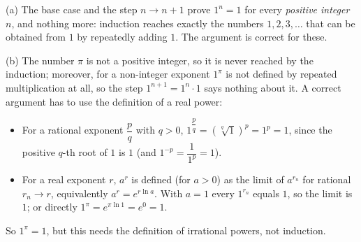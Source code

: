 (a) The base case and the step $n\to n+1$ prove $1^n=1$ for every \emph{positive integer} $n$, and nothing more: induction reaches exactly the numbers $1,2,3,\dots$ that can be obtained from $1$ by repeatedly adding $1$. The argument is correct for these.

(b) The number $\pi$ is not a positive integer, so it is never reached by the induction; moreover, for a non-integer exponent $1^{\pi}$ is not defined by repeated multiplication at all, so the step $1^{n+1}=1^n\cdot1$ says nothing about it. A correct argument has to use the definition of a real power:
\begin{itemize}
\item For a rational exponent $\dfrac{p}{q}$ with $q>0$, $1^{\dfrac{p}{q}}=\left(\sqrt[q]{1}\right)^p=1^p=1$, since the positive $q$-th root of $1$ is $1$ (and $1^{-p}=\dfrac{1}{1^p}=1$).
\item For a real exponent $r$, $a^r$ is defined (for $a>0$) as the limit of $a^{r_n}$ for rational $r_n\to r$, equivalently $a^r=e^{r\ln a}$. With $a=1$ every $1^{r_n}$ equals $1$, so the limit is $1$; or directly $1^{\pi}=e^{\pi\ln1}=e^{0}=1$.
\end{itemize}
So $1^{\pi}=\boxed{1}$, but this needs the definition of irrational powers, not induction.
